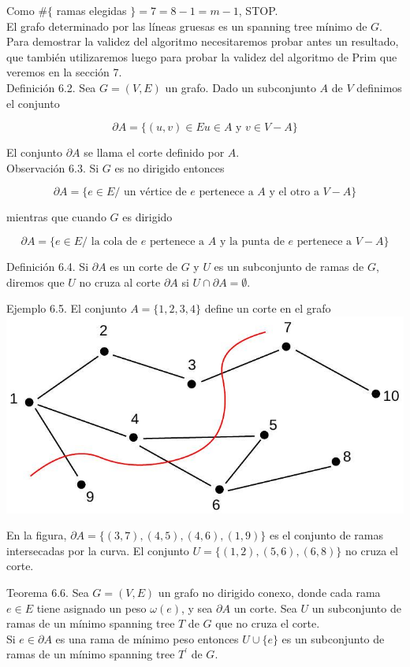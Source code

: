 \documentclass[10pt]{article}
\begin{document}
Como $\#\{$ ramas elegidas $\}=7=8-1=m-1$, STOP.\\
El grafo determinado por las líneas gruesas es un spanning tree mínimo de $G$.\\
Para demostrar la validez del algoritmo necesitaremos probar antes un resultado, que también utilizaremos luego para probar la validez del algoritmo de Prim que veremos en la sección 7.\\
Definición 6.2. Sea $G=(V, E)$ un grafo. Dado un subconjunto $A$ de $V$ definimos el conjunto

$$
\partial A=\{(u, v) \in E u \in A \text { y } v \in V-A\}
$$

El conjunto $\partial A$ se llama el corte definido por $A$.\\
Observación 6.3. Si $G$ es no dirigido entonces

$$
\partial A=\{e \in E / \text { un vértice de } e \text { pertenece a } A \text { y el otro a } V-A\}
$$

mientras que cuando $G$ es dirigido

$$
\partial A=\{e \in E / \text { la cola de } e \text { pertenece a } A \text { y la punta de } e \text { pertenece a } V-A\}
$$

Definición 6.4. Si $\partial A$ es un corte de $G$ y $U$ es un subconjunto de ramas de $G$, diremos que $U$ no cruza al corte $\partial A$ si $U \cap \partial A=\emptyset$.

Ejemplo 6.5. El conjunto $A=\{1,2,3,4\}$ define un corte en el grafo\\
\includegraphics[max width=\textwidth, center]{2025_09_05_93c7c1835f249f70c0eeg-17(1)}

En la figura, $\partial A=\{(3,7),(4,5),(4,6),(1,9)\}$ es el conjunto de ramas intersecadas por la curva. El conjunto $U=\{(1,2),(5,6),(6,8)\}$ no cruza el corte.

Teorema 6.6. Sea $G=(V, E)$ un grafo no dirigido conexo, donde cada rama $e \in E$ tiene asignado un peso $\omega(e)$, y sea $\partial A$ un corte. Sea $U$ un subconjunto de ramas de un mínimo spanning tree $T$ de $G$ que no cruza el corte.\\
Si $e \in \partial A$ es una rama de mínimo peso entonces $U \cup\{e\}$ es un subconjunto de ramas de un mínimo spanning tree $T^{\prime}$ de $G$.
\end{document}
